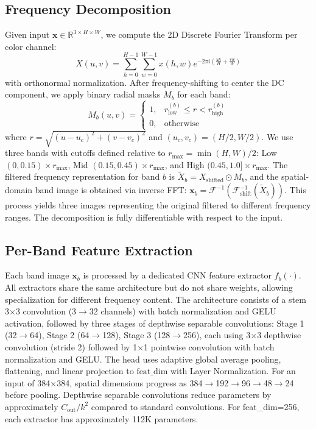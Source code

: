 \documentclass[journal]{IEEEtran}
\begin{document}
\subsection{Frequency Decomposition}
Given input $\mathbf{x} \in \mathbb{R}^{3 \times H \times W}$, we compute the 2D Discrete Fourier Transform per color channel:
\begin{equation}
X(u,v) = \sum_{h=0}^{H-1} \sum_{w=0}^{W-1} x(h,w) e^{-2\pi i (\frac{uh}{H} + \frac{vw}{W})}
\label{eq:dft}
\end{equation}
with orthonormal normalization. After frequency-shifting to center the DC component, we apply binary radial masks $M_b$ for each band:
\begin{equation}
M_b(u,v) = \begin{cases}
1, & r_{\text{low}}^{(b)} \leq r < r_{\text{high}}^{(b)} \\
0, & \text{otherwise}
\end{cases}
\label{eq:mask}
\end{equation}
where $r = \sqrt{(u - u_c)^2 + (v - v_c)^2}$ and $(u_c, v_c) = (H/2, W/2)$. We use three bands with cutoffs defined relative to $r_{\max} = \min(H,W)/2$: Low $(0, 0.15) \times r_{\max}$, Mid $(0.15, 0.45) \times r_{\max}$, and High $(0.45, 1.0] \times r_{\max}$. The filtered frequency representation for band $b$ is $\tilde{X}_b = X_{\text{shifted}} \odot M_b$, and the spatial-domain band image is obtained via inverse FFT: $\mathbf{x}_b = \mathcal{F}^{-1}(\mathcal{F}_{\text{shift}}^{-1}(\tilde{X}_b))$. This process yields three images representing the original filtered to different frequency ranges. The decomposition is fully differentiable with respect to the input.

\subsection{Per-Band Feature Extraction}
Each band image $\mathbf{x}_b$ is processed by a dedicated CNN feature extractor $f_b(\cdot)$. All extractors share the same architecture but do not share weights, allowing specialization for different frequency content. The architecture consists of a stem 3$\times$3 convolution (3$\rightarrow$32 channels) with batch normalization and GELU activation, followed by three stages of depthwise separable convolutions: Stage 1 (32$\rightarrow$64), Stage 2 (64$\rightarrow$128), Stage 3 (128$\rightarrow$256), each using 3$\times$3 depthwise convolution (stride 2) followed by 1$\times$1 pointwise convolution with batch normalization and GELU. The head uses adaptive global average pooling, flattening, and linear projection to $\text{feat\_dim}$ with Layer Normalization. For an input of 384$\times$384, spatial dimensions progress as 384$\rightarrow$192$\rightarrow$96$\rightarrow$48$\rightarrow$24 before pooling. Depthwise separable convolutions reduce parameters by approximately $C_{\text{out}}/k^2$ compared to standard convolutions. For feat\_dim=256, each extractor has approximately 112K parameters.
\end{document}
